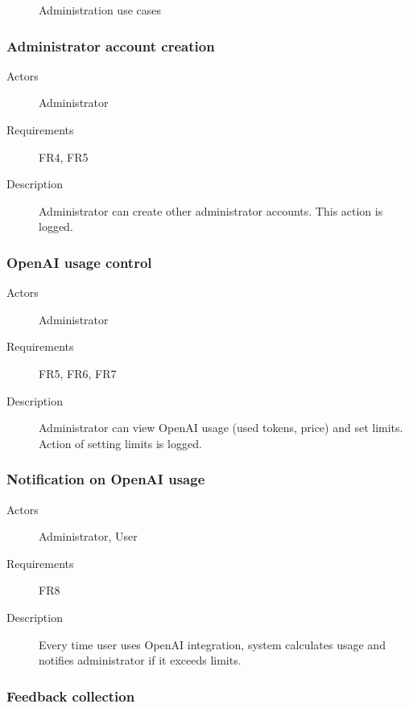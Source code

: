 \documentclass[
    english, %
]{VUMIFPSkursinis}
\begin{document}
\begin{figure}[ht]
    \centering
    
    \label{administration-use-cases}
    \caption{Administration use cases}
\end{figure}

\subsubsection{Administrator account creation}

\begin{description}
    \item[Actors] Administrator
    \item[Requirements] FR4, FR5
    \item[Description] Administrator can create other administrator accounts. This action is logged.
\end{description}

\subsubsection{OpenAI usage control}

\begin{description}
    \item[Actors] Administrator
    \item[Requirements] FR5, FR6, FR7
    \item[Description] Administrator can view OpenAI usage (used tokens, price) and set limits. Action of setting limits is logged.
\end{description}

\subsubsection{Notification on OpenAI usage}

\begin{description}
    \item[Actors] Administrator, User
    \item[Requirements] FR8
    \item[Description] Every time user uses OpenAI integration, system calculates usage and notifies administrator if it exceeds limits.
\end{description}

\subsubsection{Feedback collection}
\end{document}
